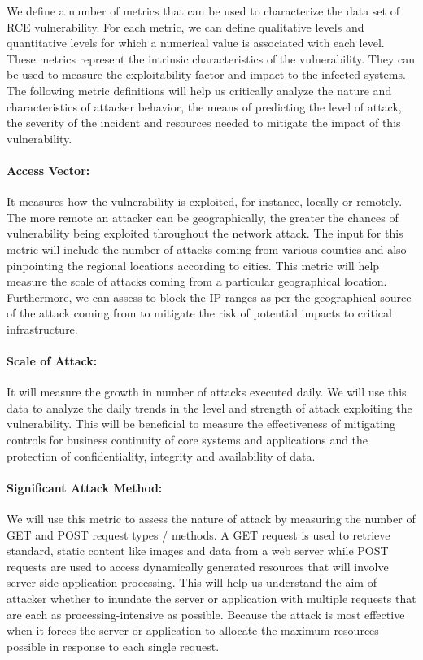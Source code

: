 We define a number of metrics that can be used to characterize the data set of RCE vulnerability. For each metric, we can define qualitative levels and quantitative levels for which a numerical value is associated with each level. These metrics represent the intrinsic characteristics of the vulnerability. They can be used to measure the exploitability factor and impact to the infected systems. The following metric definitions will help us critically analyze the nature and characteristics of attacker behavior, the means of predicting the level of attack, the severity of the incident and resources needed to mitigate the impact of this vulnerability.    
\indent
\paragraph{Access Vector:}
It measures how the vulnerability is exploited, for instance, locally or remotely. The more remote an attacker can be geographically, the greater the chances of vulnerability being exploited throughout the network attack.  The input for this metric will include the number of attacks coming from various counties and also pinpointing the regional locations according to cities. This metric will help measure the scale of attacks coming from a particular geographical location. Furthermore, we can assess to block the IP ranges as per the geographical source of the attack coming from to mitigate the risk of potential impacts to critical infrastructure.
\indent
\paragraph{Scale of Attack:}
It will measure the growth in number of attacks executed daily. We will use this data to analyze the daily trends in the level and strength of attack exploiting the vulnerability. This will be beneficial to measure the effectiveness of mitigating controls for business continuity of core systems and applications and the protection of confidentiality, integrity and availability of data.
\indent
\paragraph{Significant Attack Method:}
We will use this metric to assess the nature of attack by measuring the number of GET and POST request types / methods. A GET request is used to retrieve standard, static content like images and data from a web server while POST requests are used to access dynamically generated resources that will involve server side application processing. This will help us understand the aim of attacker whether to inundate the server or application with multiple requests that are each as processing-intensive as possible. Because the attack is most effective when it forces the server or application to allocate the maximum resources possible in response to each single request.
\indent

